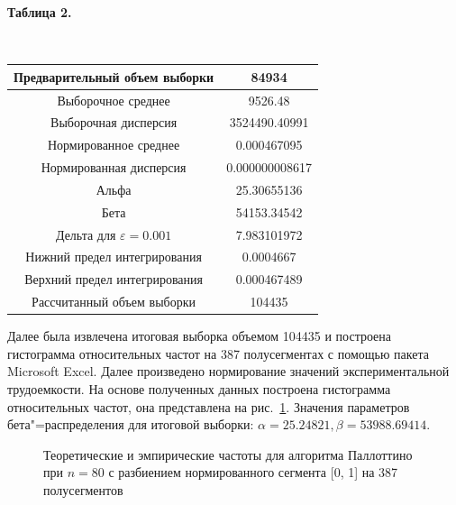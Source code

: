 \documentclass[a4paper, article, 12pt]{extarticle}
\begin{document}
\begin{center}\label{table4}
	\begin{small}
		\textbf{Таблица 2.}
	\end{small}\\
	\hfill \break
	\begin{tabular}{|c|c|}
		\hline
		Предварительный объем выборки & 84934\\
		\hline
		Выборочное среднее & 9526.48\\
		\hline
		Выборочная дисперсия & 3524490.40991\\
		\hline
		Нормированное среднее & 0.000467095\\
		\hline
		Нормированная дисперсия & 0.000000008617\\
		\hline
		Альфа & 25.30655136\\
		\hline
		Бета & 54153.34542\\
		\hline
		Дельта для $\varepsilon = 0.001$ & 7.983101972\\
		\hline
		Нижний предел интегрирования & 0.0004667\\
		\hline
		Верхний предел интегрирования & 0.000467489\\
		\hline
		Рассчитанный объем выборки & 104435\\
		\hline
	\end{tabular}
\end{center}

Далее была извлечена итоговая выборка объемом 104435 и построена гистограмма относительных частот на 387 полусегментах с помощью пакета Microsoft Excel. Далее произведено нормирование значений экспериментальной трудоемкости. На основе полученных данных построена гистограмма относительных частот, она представлена на рис.~\ref{fig:histogram}. Значения параметров бета"=распределения для итоговой выборки: $\alpha = 25.24821, \beta = 53988.69414$.

\begin{figure}[h]
	\caption{Теоретические и эмпирические частоты для алгоритма Паллоттино при $n = 80$ с разбиением нормированного сегмента [0, 1] на 387 полусегментов}
	\label{fig:histogram}
\end{figure}
\end{document}
